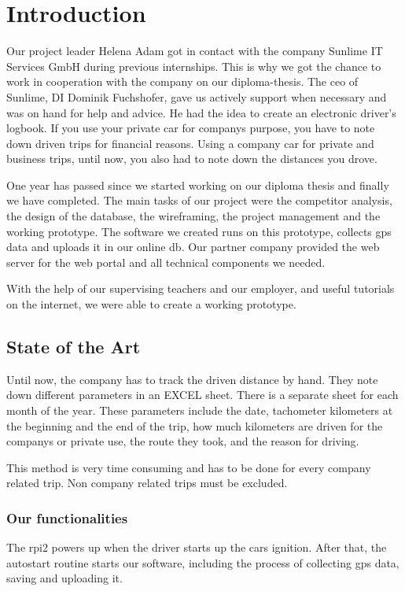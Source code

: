 \chapter*{Introduction}
Our project leader Helena Adam got in contact with the company Sunlime IT Services GmbH during previous internships. This is why we got the chance to work in cooperation with the company on our diploma-thesis. The \gls{ceo} of Sunlime, DI Dominik Fuchshofer, gave us actively support when necessary and was on hand for help and advice.
He had the idea to create an electronic driver’s logbook. If you use your private car for companys purpose, you have to note down driven trips for financial reasons. Using a company car for private and business trips, until now, you also had to note down the distances you drove.

One year has passed since we started working on our diploma thesis and finally we have completed. The main tasks of our project were the competitor analysis, the design of the database, the wireframing, the project management and the working prototype. The software we created runs on this prototype, collects \gls{gps} data and uploads it in our online \gls{db}. Our partner company provided the web server for the web portal and all technical components we needed. 

With the help of our supervising teachers and our employer, and useful tutorials on the internet, we were able to create a working prototype.
\clearpageauthor
\newpage
\section*{State of the Art}
Until now, the company has to track the driven distance by hand. They note down different parameters in an EXCEL sheet. There is a separate sheet for each month of the year. These parameters include the date, tachometer kilometers at the beginning and the end of the trip, how much kilometers are driven for the companys or private use, the route they took, and the reason for driving.

This method is very time consuming and has to be done for every company related trip. Non company related trips must be excluded.
\subsection*{Our functionalities}
The \gls{rpi2} powers up when the driver starts up the cars ignition. After that, the autostart routine starts our software, including the process of collecting \gls{gps} data, saving and uploading it.

